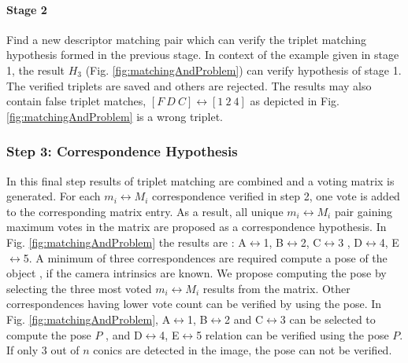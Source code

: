 \documentclass{bmvc2k}
\begin{document}
\paragraph{Stage 2} Find a new descriptor matching pair which can verify the triplet matching hypothesis formed in the previous stage. In context of the example given in stage 1, the result $ H_3 $ (Fig. \ref{fig:matchingAndProblem}) can verify hypothesis of stage 1.  
%
The verified triplets are saved and others are rejected. 
The results may also contain false triplet matches, $ [F~ D ~C]\leftrightarrow [1~ 2~ 4]$ as depicted in Fig.\ref{fig:matchingAndProblem} is a wrong triplet. 

\subsubsection{Step 3: Correspondence Hypothesis }
\label{subSec:CHypo}
In this final step results of triplet matching are combined and a voting matrix is generated. 
For each $ m_i \leftrightarrow M_i $ correspondence verified in step 2, one vote is added to the corresponding matrix entry. 
As a result, all unique $ m_i \leftrightarrow M_i $ pair gaining maximum votes in the matrix are proposed as a correspondence hypothesis.
In Fig. \ref{fig:matchingAndProblem} the results are : A$ \leftrightarrow $1, B$ \leftrightarrow $2, C$ \leftrightarrow $3 , D$ \leftrightarrow $4, E$ \leftrightarrow $5. 
A minimum of three correspondences are required compute a pose of the object \cite{lepetit_monocular_2005}, if the camera intrinsics are known. 
We propose computing the pose by selecting the three most voted $ m_i \leftrightarrow M_i $ results from the matrix.  
Other correspondences having lower vote count can be verified by using the pose. 
In Fig. \ref{fig:matchingAndProblem}, A$ \leftrightarrow $1, B$ \leftrightarrow $2 and C$ \leftrightarrow $3 can be selected to compute the pose $ P $ , and D$ \leftrightarrow $4, E$ \leftrightarrow $5 relation can be verified using the pose $ P $.
If only 3 out of $ n $ conics are detected in the image, the pose can not be verified. 
\end{document}
